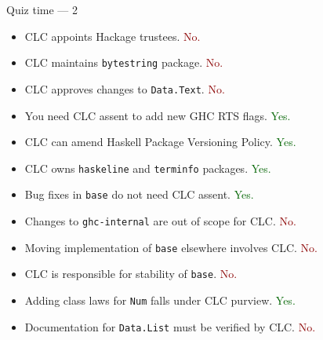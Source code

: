 \documentclass[handout]{beamer}
\begin{document}
\begin{frame}{Quiz time --- 2}

\begin{itemize}

\def\yes{\textcolor{darkgreen}{Yes.}}
\def\no{\textcolor{darkred}{No.}}

\item CLC appoints Hackage trustees. \no
\item CLC maintains {\tt bytestring} package. \no
\item CLC approves changes to {\tt Data.Text}. \no
\item You need CLC assent to add new GHC RTS flags. \yes
\item CLC can amend Haskell Package Versioning Policy. \yes
\item CLC owns {\tt haskeline} and {\tt terminfo} packages. \yes
\item Bug fixes in {\tt base} do not need CLC assent. \yes
\item Changes to {\tt ghc-internal} are out of scope for CLC. \no
\item Moving implementation of {\tt base} elsewhere involves CLC. \no
\item CLC is responsible for stability of {\tt base}. \no
\item Adding class laws for {\tt Num} falls under CLC purview. \yes
\item Documentation for {\tt Data.List} must be verified by CLC. \no

\end{itemize}

\end{frame}
\end{document}
